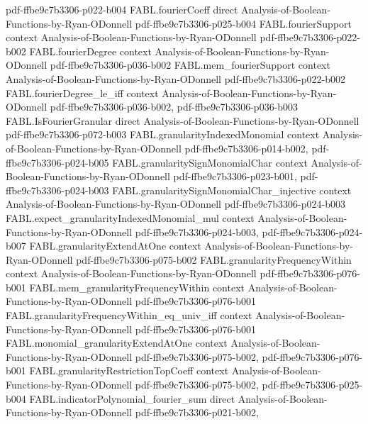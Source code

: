 \begin{theorem}
{    pdf-ffbe9c7b3306-p022-b004}
\proofstep
  {FABL.fourierCoeff}
  {direct}
  {Analysis-of-Boolean-Functions-by-Ryan-ODonnell}
  {pdf-ffbe9c7b3306-p025-b004}
\proofstep
  {FABL.fourierSupport}
  {context}
  {Analysis-of-Boolean-Functions-by-Ryan-ODonnell}
  {pdf-ffbe9c7b3306-p022-b002}
\proofstep
  {FABL.fourierDegree}
  {context}
  {Analysis-of-Boolean-Functions-by-Ryan-ODonnell}
  {pdf-ffbe9c7b3306-p036-b002}
\proofstep
  {FABL.mem_fourierSupport}
  {context}
  {Analysis-of-Boolean-Functions-by-Ryan-ODonnell}
  {pdf-ffbe9c7b3306-p022-b002}
\proofstep
  {FABL.fourierDegree_le_iff}
  {context}
  {Analysis-of-Boolean-Functions-by-Ryan-ODonnell}
  {pdf-ffbe9c7b3306-p036-b002,
    pdf-ffbe9c7b3306-p036-b003}
\proofstep
  {FABL.IsFourierGranular}
  {direct}
  {Analysis-of-Boolean-Functions-by-Ryan-ODonnell}
  {pdf-ffbe9c7b3306-p072-b003}
\proofstep
  {FABL.granularityIndexedMonomial}
  {context}
  {Analysis-of-Boolean-Functions-by-Ryan-ODonnell}
  {pdf-ffbe9c7b3306-p014-b002,
    pdf-ffbe9c7b3306-p024-b005}
\proofstep
  {FABL.granularitySignMonomialChar}
  {context}
  {Analysis-of-Boolean-Functions-by-Ryan-ODonnell}
  {pdf-ffbe9c7b3306-p023-b001,
    pdf-ffbe9c7b3306-p024-b003}
\proofstep
  {FABL.granularitySignMonomialChar_injective}
  {context}
  {Analysis-of-Boolean-Functions-by-Ryan-ODonnell}
  {pdf-ffbe9c7b3306-p024-b003}
\proofstep
  {FABL.expect_granularityIndexedMonomial_mul}
  {context}
  {Analysis-of-Boolean-Functions-by-Ryan-ODonnell}
  {pdf-ffbe9c7b3306-p024-b003,
    pdf-ffbe9c7b3306-p024-b007}
\proofstep
  {FABL.granularityExtendAtOne}
  {context}
  {Analysis-of-Boolean-Functions-by-Ryan-ODonnell}
  {pdf-ffbe9c7b3306-p075-b002}
\proofstep
  {FABL.granularityFrequencyWithin}
  {context}
  {Analysis-of-Boolean-Functions-by-Ryan-ODonnell}
  {pdf-ffbe9c7b3306-p076-b001}
\proofstep
  {FABL.mem_granularityFrequencyWithin}
  {context}
  {Analysis-of-Boolean-Functions-by-Ryan-ODonnell}
  {pdf-ffbe9c7b3306-p076-b001}
\proofstep
  {FABL.granularityFrequencyWithin_eq_univ_iff}
  {context}
  {Analysis-of-Boolean-Functions-by-Ryan-ODonnell}
  {pdf-ffbe9c7b3306-p076-b001}
\proofstep
  {FABL.monomial_granularityExtendAtOne}
  {context}
  {Analysis-of-Boolean-Functions-by-Ryan-ODonnell}
  {pdf-ffbe9c7b3306-p075-b002,
    pdf-ffbe9c7b3306-p076-b001}
\proofstep
  {FABL.granularityRestrictionTopCoeff}
  {context}
  {Analysis-of-Boolean-Functions-by-Ryan-ODonnell}
  {pdf-ffbe9c7b3306-p075-b002,
    pdf-ffbe9c7b3306-p025-b004}
\proofstep
  {FABL.indicatorPolynomial_fourier_sum}
  {direct}
  {Analysis-of-Boolean-Functions-by-Ryan-ODonnell}
  {pdf-ffbe9c7b3306-p021-b002,
}
\end{theorem}
